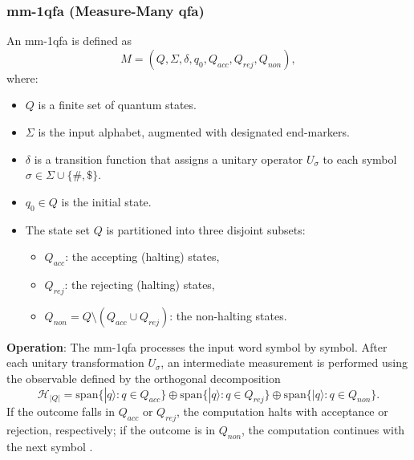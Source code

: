 \subsubsection{mm-1qfa (Measure-Many qfa)}
\label{sssec:mm-1qfa}
\begin{definition}[mm-1qfa]
An \gls{mm-1qfa} is defined as 
\[
M = (Q, \Sigma, \delta, q_0, Q_{acc}, Q_{rej}, Q_{non}),
\]
where:
\begin{itemize}
    \item \( Q \) is a finite set of quantum states.
    \item \( \Sigma \) is the input alphabet, augmented with designated end-markers.
    \item \( \delta \) is a transition function that assigns a unitary operator \( U_\sigma \) to each symbol \( \sigma \in \Sigma \cup \{\#, \$\} \).
    \item \( q_0 \in Q \) is the initial state.
    \item The state set \( Q \) is partitioned into three disjoint subsets:
    \begin{itemize}
        \item \( Q_{acc} \): the accepting (halting) states,
        \item \( Q_{rej} \): the rejecting (halting) states,
        \item \( Q_{non} = Q \setminus (Q_{acc} \cup Q_{rej}) \): the non-halting states.
    \end{itemize}
\end{itemize}
\end{definition}

\textbf{Operation}:  
The \gls{mm-1qfa} processes the input word symbol by symbol. After each unitary transformation \( U_\sigma \), an intermediate measurement is performed using the observable defined by the orthogonal decomposition 
\[
\mathcal{H}_{|Q|} = \mathrm{span}\{ |q\rangle : q \in Q_{acc} \} \oplus \mathrm{span}\{ |q\rangle : q \in Q_{rej} \} \oplus \mathrm{span}\{ |q\rangle : q \in Q_{non} \}.
\]
If the outcome falls in \( Q_{acc} \) or \( Q_{rej} \), the computation halts with acceptance or rejection, respectively; if the outcome is in \( Q_{non} \), the computation continues with the next symbol \cite{kondacs1997power,ambainis2009superiority}.

